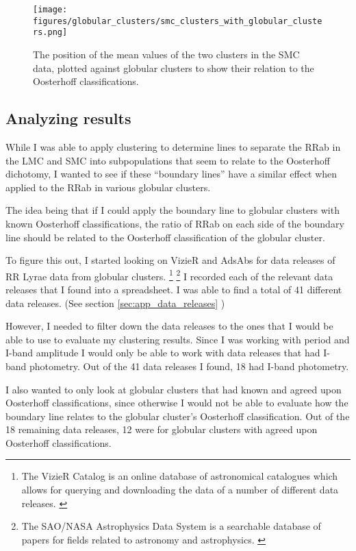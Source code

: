 \documentclass[]{article}
\begin{document}
\begin{figure}
	\centering
	\texttt{[image: figures/globular\_clusters/smc\_clusters\_with\_globular\_clusters.png]}
	\caption{The position of the mean values of the two clusters in the SMC data, plotted against globular clusters to show their relation to the Oosterhoff classifications.}
	\label{fig:smc_clustering_with_gcs}
\end{figure}

\subsection{Analyzing results}
While I was able to apply clustering to determine lines to separate the RRab in the LMC and SMC into subpopulations that seem to relate to the Oosterhoff dichotomy, I wanted to see if these ``boundary lines'' have a similar effect when applied to the RRab in various globular clusters.

The idea being that if I could apply the boundary line to globular clusters with known Oosterhoff classifications, the ratio of RRab on each side of the boundary line should be related to the Oosterhoff classification of the globular cluster.

To figure this out, I started looking on VizieR and AdsAbs for data releases of RR Lyrae data from globular clusters. \footnote{The VizieR Catalog is an online database of astronomical catalogues which allows for querying and downloading the data of a number of different data releases. \cite{ochsenbein_2000}} \footnote{The SAO/NASA Astrophysics Data System is a searchable database of papers for fields related to astronomy and astrophysics. \cite{accomazzi_2015}} I recorded each of the relevant data releases that I found into a spreadsheet. I was able to find a total of 41 different data releases. (See section \ref{sec:app_data_releases} )

However, I needed to filter down the data releases to the ones that I would be able to use to evaluate my clustering results. Since I was working with period and I-band amplitude I would only be able to work with data releases that had I-band photometry. Out of the 41 data releases I found, 18 had I-band photometry.

I also wanted to only look at globular clusters that had known and agreed upon Oosterhoff classifications, since otherwise I would not be able to evaluate how the boundary line relates to the globular cluster’s Oosterhoff classification. Out of the 18 remaining data releases, 12 were for globular clusters with agreed upon Oosterhoff classifications.
\end{document}
